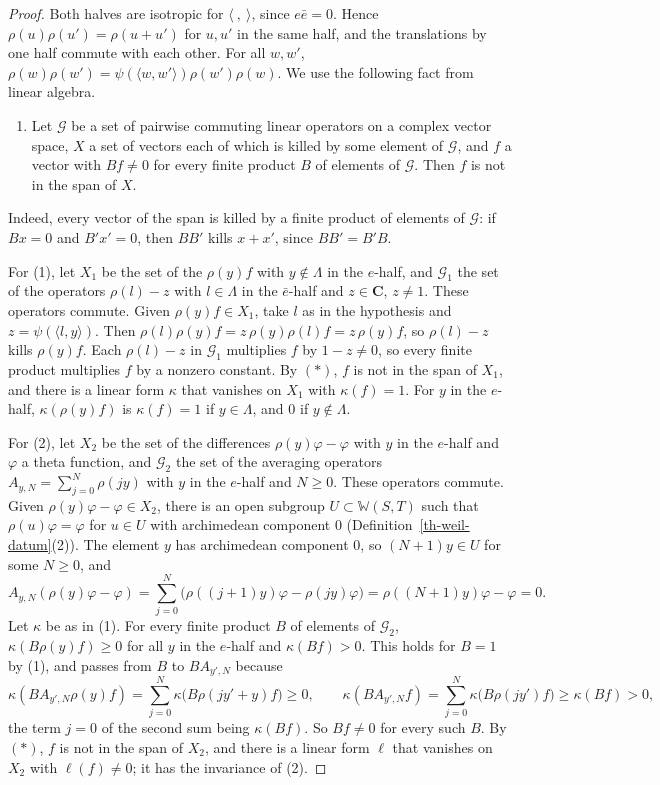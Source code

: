 \begin{proof}
Both halves are isotropic for $\langle\ ,\ \rangle$, since $e\bar e=0$. Hence
$\rho(u)\rho(u')=\rho(u+u')$ for $u,u'$ in the same half, and the
translations by one half commute with each other. For all $w,w'$,
$\rho(w)\rho(w')=\psi(\langle w,w'\rangle)\rho(w')\rho(w)$. We use the
following fact from linear algebra.
\begin{enumerate}
\item[$(*)$] Let $\mathcal G$ be a set of pairwise commuting linear operators on
  a complex vector space, $X$ a set of vectors each of which is killed by some
  element of $\mathcal G$, and $f$ a vector with $Bf\neq0$ for every finite
  product $B$ of elements of $\mathcal G$. Then $f$ is not in the span of $X$.
\end{enumerate}
Indeed, every vector of the span is killed by a finite product of elements of
$\mathcal G$: if $Bx=0$ and $B'x'=0$, then $BB'$ kills $x+x'$, since
$BB'=B'B$.

For (1), let $X_1$ be the set of the $\rho(y)f$ with $y\notin\Lambda$ in the
$e$-half, and $\mathcal G_1$ the set of the operators $\rho(l)-z$ with
$l\in\Lambda$ in the $\bar e$-half and $z\in\mathbf C$, $z\neq1$. These operators
commute. Given $\rho(y)f\in X_1$, take $l$ as in the hypothesis and
$z=\psi(\langle l,y\rangle)$. Then $\rho(l)\rho(y)f=z\,\rho(y)\rho(l)f=z\,\rho(y)f$,
so $\rho(l)-z$ kills $\rho(y)f$. Each $\rho(l)-z$ in $\mathcal G_1$ multiplies
$f$ by $1-z\neq0$, so every finite product multiplies $f$ by a nonzero constant.
By $(*)$, $f$ is not in the span of $X_1$, and there is a linear form $\kappa$
that vanishes on $X_1$ with $\kappa(f)=1$. For $y$ in the $e$-half,
$\kappa(\rho(y)f)$ is $\kappa(f)=1$ if $y\in\Lambda$, and $0$ if $y\notin\Lambda$.

For (2), let $X_2$ be the set of the differences $\rho(y)\varphi-\varphi$ with $y$
in the $e$-half and $\varphi$ a theta function, and $\mathcal G_2$ the set of the
averaging operators $A_{y,N}=\sum_{j=0}^N\rho(jy)$ with $y$ in the $e$-half and
$N\geq0$. These operators commute. Given $\rho(y)\varphi-\varphi\in X_2$, there is
an open subgroup $U\subset\mathbb W(S,T)$ such that $\rho(u)\varphi=\varphi$ for
$u\in U$ with archimedean component $0$
(Definition~\ref{th-weil-datum}(2)). The element $y$ has archimedean component
$0$, so $(N+1)y\in U$ for some $N\geq0$, and
\[
A_{y,N}(\rho(y)\varphi-\varphi)=\sum_{j=0}^N\bigl(\rho((j+1)y)\varphi-\rho(jy)\varphi\bigr)
=\rho((N+1)y)\varphi-\varphi=0 .
\]
Let $\kappa$ be as in (1). For every finite product $B$ of elements of
$\mathcal G_2$, $\kappa(B\rho(y)f)\geq0$ for all $y$ in the $e$-half and
$\kappa(Bf)>0$. This holds for $B=1$ by (1), and passes from $B$ to $BA_{y',N}$
because
\[
\kappa(BA_{y',N}\rho(y)f)=\sum_{j=0}^N\kappa\bigl(B\rho(jy'+y)f\bigr)\geq0,\qquad
\kappa(BA_{y',N}f)=\sum_{j=0}^N\kappa\bigl(B\rho(jy')f\bigr)\geq\kappa(Bf)>0,
\]
the term $j=0$ of the second sum being $\kappa(Bf)$. So $Bf\neq0$ for every such
$B$. By $(*)$, $f$ is not in the span of $X_2$, and there is a linear form $\ell$
that vanishes on $X_2$ with $\ell(f)\neq0$; it has the invariance of (2).
\end{proof}

